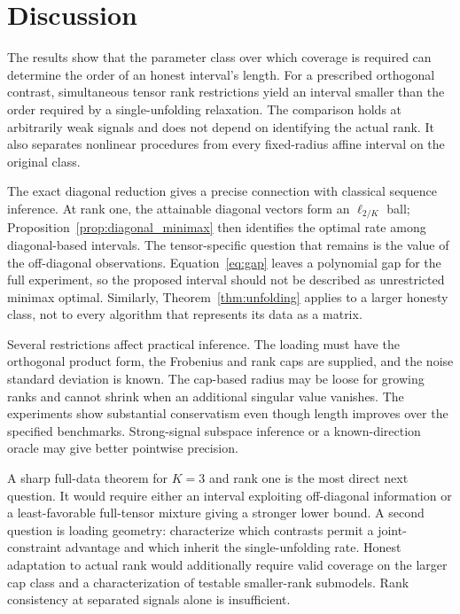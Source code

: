 \documentclass[11pt]{article}
\theoremstyle{remark}
\begin{document}
\begin{table}[ht]
\centering

\caption{Noise-assumption stress at $A=0$, $K=3$, $p=n=512$, cap one and nominal level 0.95. Only the first row belongs to the stated iid Gaussian model. These results delimit the calibration; they do not support a robustness claim.}
\label{tab:stress}
\end{table}

\section{Discussion}\label{sec:discussion}

The results show that the parameter class over which coverage is required can determine the order of an honest interval's length. For a prescribed orthogonal contrast, simultaneous tensor rank restrictions yield an interval smaller than the order required by a single-unfolding relaxation. The comparison holds at arbitrarily weak signals and does not depend on identifying the actual rank. It also separates nonlinear procedures from every fixed-radius affine interval on the original class.

The exact diagonal reduction gives a precise connection with classical sequence inference. At rank one, the attainable diagonal vectors form an $\ell_{2/K}$ ball; Proposition~\ref{prop:diagonal_minimax} then identifies the optimal rate among diagonal-based intervals. The tensor-specific question that remains is the value of the off-diagonal observations. Equation~\eqref{eq:gap} leaves a polynomial gap for the full experiment, so the proposed interval should not be described as unrestricted minimax optimal. Similarly, Theorem~\ref{thm:unfolding} applies to a larger honesty class, not to every algorithm that represents its data as a matrix.

Several restrictions affect practical inference. The loading must have the orthogonal product form, the Frobenius and rank caps are supplied, and the noise standard deviation is known. The cap-based radius may be loose for growing ranks and cannot shrink when an additional singular value vanishes. The experiments show substantial conservatism even though length improves over the specified benchmarks. Strong-signal subspace inference or a known-direction oracle may give better pointwise precision.

A sharp full-data theorem for $K=3$ and rank one is the most direct next question. It would require either an interval exploiting off-diagonal information or a least-favorable full-tensor mixture giving a stronger lower bound. A second question is loading geometry: characterize which contrasts permit a joint-constraint advantage and which inherit the single-unfolding rate. Honest adaptation to actual rank would additionally require valid coverage on the larger cap class and a characterization of testable smaller-rank submodels. Rank consistency at separated signals alone is insufficient.
\end{document}
